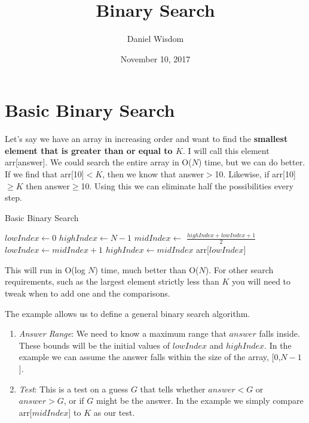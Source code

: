 \documentclass[11pt]{article}
\title{Binary Search}
\author{Daniel Wisdom}
\date{November 10, 2017}
\begin{document}
\maketitle



\section{Basic Binary Search}
Let's say we have an array in increasing order and want to find the \textbf{smallest element that is greater than or equal to $K$}.  I will call this element arr[answer].  We could search the entire array in O($N$) time, but we can do better.  If we find that arr[10]$<$$K$, then we know that answer$>$10.  Likewise, if arr[10]$\geq$$K$ then answer$\geq$10.  Using this we can eliminate half the possibilities every step.

\begin{algorithm}[H]
\caption{Basic Binary Search}
\begin{algorithmic}
        \State $lowIndex \gets 0$ 
        \State $highIndex \gets N-1$ 
            \State $midIndex \gets$ \( \frac{highIndex + lowIndex + 1}{2} \)
                \State $lowIndex \gets midIndex+1$
            \Else
                \State $highIndex \gets midIndex$
            \EndIf
        \EndWhile
        \State
        \Return arr[$lowIndex$]
    \EndFunction
\end{algorithmic}
\end{algorithm}

This will run in O(log $N$) time, much better than O($N$).  For other search requirements, such as the largest element strictly less than $K$ you will need to tweak when to add one and the comparisons.

The example allows us to define a general binary search algorithm.
\begin{enumerate}
    \item \textit{Answer Range}: We need to know a maximum range that $answer$ falls inside. These bounds will be the initial values of $lowIndex$ and $highIndex$.  In the example we can assume the answer falls within the size of the array, [0,$N-1$].
    \item \textit{Test}: This is a test on a guess $G$ that tells whether $answer < G$ or $answer > G$, or if $G$ might be the answer.  In the example we simply compare arr[$midIndex$] to $K$ as our test.
\end{enumerate}
\end{document}
